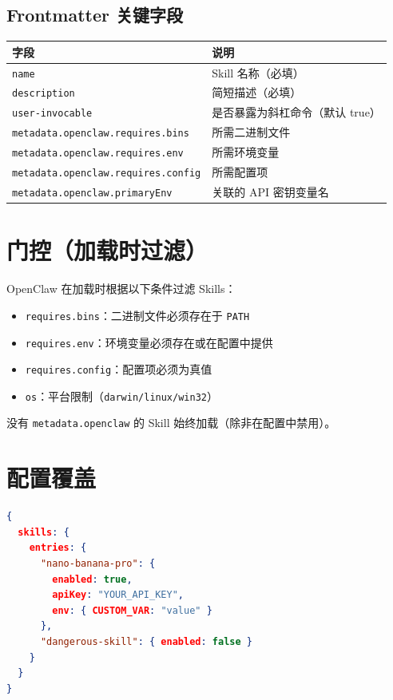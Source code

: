 \subsection{Frontmatter 关键字段}

\begin{center}
\begin{tabular}{ll}
\toprule
\textbf{字段} & \textbf{说明} \\
\midrule
\texttt{name} & Skill 名称（必填） \\
\texttt{description} & 简短描述（必填） \\
\texttt{user-invocable} & 是否暴露为斜杠命令（默认 true） \\
\texttt{metadata.openclaw.requires.bins} & 所需二进制文件 \\
\texttt{metadata.openclaw.requires.env} & 所需环境变量 \\
\texttt{metadata.openclaw.requires.config} & 所需配置项 \\
\texttt{metadata.openclaw.primaryEnv} & 关联的 API 密钥变量名 \\
\bottomrule
\end{tabular}
\end{center}

\section{门控（加载时过滤）}

OpenClaw 在加载时根据以下条件过滤 Skills：

\begin{itemize}
  \item \texttt{requires.bins}：二进制文件必须存在于 \texttt{PATH}
  \item \texttt{requires.env}：环境变量必须存在或在配置中提供
  \item \texttt{requires.config}：配置项必须为真值
  \item \texttt{os}：平台限制（\texttt{darwin/linux/win32}）
\end{itemize}

没有 \texttt{metadata.openclaw} 的 Skill 始终加载（除非在配置中禁用）。

\section{配置覆盖}

\begin{lstlisting}[language=json]
{
  skills: {
    entries: {
      "nano-banana-pro": {
        enabled: true,
        apiKey: "YOUR_API_KEY",
        env: { CUSTOM_VAR: "value" }
      },
      "dangerous-skill": { enabled: false }
    }
  }
}
\end{lstlisting}

